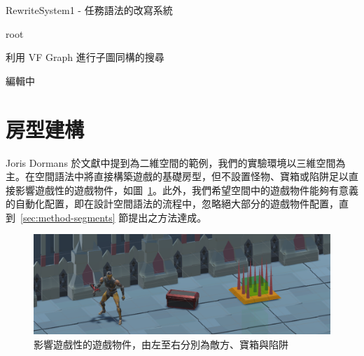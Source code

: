 \begin{algorithm}
    \caption{RewriteSystem1 - 任務語法的改寫系統}
    \label{alg:algorithm-missiongrammars-rewritesystem}
    \begin{algorithmic}
        \ENDIF
        \ENDFOR
        \RETURN root
    \end{algorithmic}
\end{algorithm}

\begin{algorithm}
    \caption{利用 VF Graph 進行子圖同構的搜尋}
    \label{alg:algorithm-missiongrammars-rewritesystem-findmatchs}
    \begin{algorithmic}
        \RETURN 編輯中
    \end{algorithmic}
\end{algorithm}

\section{房型建構}
\label{sec:method-spacepieces}

Joris Dormans 於文獻中提到為二維空間的範例，我們的實驗環境以三維空間為主。在空間語法中將直接構築遊戲的基礎房型，但不設置怪物、寶箱或陷阱足以直接影響遊戲性的遊戲物件，如圖~\ref{fig:gameobject-list}。此外，我們希望空間中的遊戲物件能夠有意義的自動化配置，即在設計空間語法的流程中，忽略絕大部分的遊戲物件配置，直到~\ref{sec:method-segments} 節提出之方法達成。

\begin{figure}[ht]
  \begin{center}
    \includegraphics[width=1.0\textwidth]{figures/gameobject-list.png}
    \caption{影響遊戲性的遊戲物件，由左至右分別為敵方、寶箱與陷阱} 
    \label{fig:gameobject-list}
  \end{center}
\end{figure}

